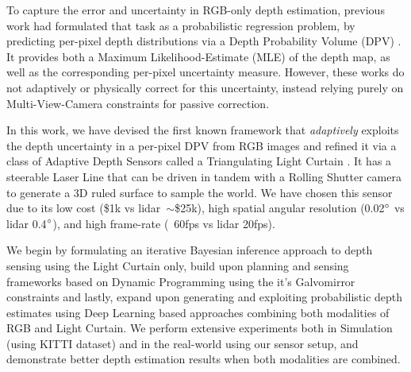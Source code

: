 \documentclass[review]{cvpr}
\begin{document}
To capture the error and uncertainty in RGB-only depth estimation, previous work had formulated that task as a probabilistic regression problem, by predicting per-pixel depth distributions via a Depth Probability Volume (DPV) \cite{liu2019neural} \cite{chang2018pyramid} \cite{yang2019inferring}. It provides both a Maximum Likelihood-Estimate (MLE) of the depth map, as well as the corresponding per-pixel uncertainty measure. However, these works do not adaptively or physically correct for this uncertainty, instead relying purely on Multi-View-Camera constraints for passive correction.

In this work, we have devised the first known framework that \textit{adaptively} exploits the depth uncertainty in a per-pixel DPV from RGB images and refined it via a class of Adaptive Depth Sensors called a Triangulating Light Curtain \cite{bartels2019Agile}. It has a steerable Laser Line that can be driven in tandem with a Rolling Shutter camera to generate a 3D ruled surface to sample the world. We have chosen this sensor due to its low cost (\$1k vs lidar~$\sim$\$25k), high spatial angular resolution (0.02$\degree$ vs lidar 0.4$\degree$), and high frame-rate (~60fps vs lidar 20fps).

We begin by formulating an iterative Bayesian inference approach to depth sensing using the Light Curtain only, build upon planning and sensing frameworks based on Dynamic Programming using the it's Galvomirror constraints and lastly, expand upon generating and exploiting probabilistic depth estimates using Deep Learning based approaches combining both modalities of RGB and Light Curtain. We perform extensive experiments both in Simulation (using KITTI \cite{Geiger2013IJRR} dataset) and in the real-world using our sensor setup, and demonstrate better depth estimation results when both modalities are combined.





  

\clearpage 

{\small


}
\end{document}

